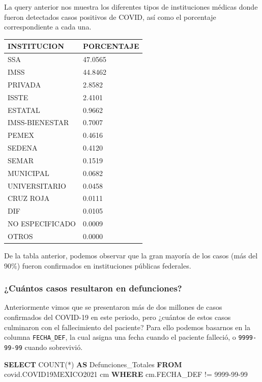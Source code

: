 \documentclass[11pt]{article}
\newenvironment{Shaded}{}{}
\newcommand{\KeywordTok}[1]{\textcolor[rgb]{0.00,0.44,0.13}{\textbf{{#1}}}}
\newcommand{\StringTok}[1]{\textcolor[rgb]{0.25,0.44,0.63}{{#1}}}
\newcommand{\FunctionTok}[1]{\textcolor[rgb]{0.02,0.16,0.49}{{#1}}}
\newcommand{\NormalTok}[1]{{#1}}
\newcommand{\OperatorTok}[1]{\textcolor[rgb]{0.40,0.40,0.40}{{#1}}}
\begin{document}
La query anterior nos muestra los diferentes tipos de instituciones
médicas donde fueron detectados casos positivos de COVID, así como el
porcentaje correspondiente a cada una.

\begin{longtable}[]{@{}ll@{}}
\toprule\noalign{}
INSTITUCION & PORCENTAJE \\
\midrule\noalign{}
\endhead
\bottomrule\noalign{}
\endlastfoot
SSA & 47.0565 \\
IMSS & 44.8462 \\
PRIVADA & 2.8582 \\
ISSTE & 2.4101 \\
ESTATAL & 0.9662 \\
IMSS-BIENESTAR & 0.7007 \\
PEMEX & 0.4616 \\
SEDENA & 0.4120 \\
SEMAR & 0.1519 \\
MUNICIPAL & 0.0682 \\
UNIVERSITARIO & 0.0458 \\
CRUZ ROJA & 0.0111 \\
DIF & 0.0105 \\
NO ESPECIFICADO & 0.0009 \\
OTROS & 0.0000 \\
\end{longtable}

De la tabla anterior, podemos observar que la gran mayoría de los casos
(más del 90\%) fueron confirmados en instituciones públicas federales.

\hypertarget{cuuxe1ntos-casos-resultaron-en-defunciones}{%
\subsubsection{¿Cuántos casos resultaron en
defunciones?}\label{cuuxe1ntos-casos-resultaron-en-defunciones}}

Anteriormente vimos que se presentaron más de dos millones de casos
confirmados del COVID-19 en este periodo, pero ¿cuántos de estos casos
culminaron con el fallecimiento del paciente? Para ello podemos basarnos
en la columna \texttt{FECHA\_DEF}, la cual asigna una fecha cuando el
paciente falleció, o \texttt{9999-99-99} cuando sobrevivió.

\begin{Shaded}
\begin{Highlighting}[]
\KeywordTok{SELECT} 
    \FunctionTok{COUNT}\NormalTok{(}\OperatorTok{*}\NormalTok{) }\KeywordTok{AS}\NormalTok{ Defunciones\_Totales}
\KeywordTok{FROM}
\NormalTok{    covid.COVID19MEXICO2021 cm }
\KeywordTok{WHERE} 
\NormalTok{    cm.FECHA\_DEF }\OperatorTok{!=} \StringTok{\textquotesingle{}9999{-}99{-}99\textquotesingle{}}
\end{Highlighting}
\end{Shaded}
\end{document}

